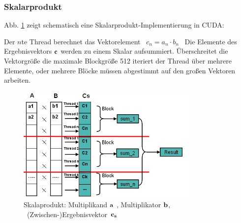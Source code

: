 


\subsubsection{Skalarprodukt}

Abb. \ref{Vektor} zeigt schematisch eine Skalarprodukt-Implementierung in CUDA:

Der $n$te Thread berechnet das Vektorelement \mbox{ $c_n = a_n \cdot b_n$ }
Die Elemente des Ergebnisvektors $ \bf c $ werden  zu einem Skalar
aufsummiert.
Überschreitet die Vektorgröße die maximale Blockgröße 512 iteriert der Thread
über mehrere Elemente, oder mehrere Blöcke müssen
abgestimmt auf den großen Vektoren arbeiten.


\begin{figure}[htbp]
\includegraphics[width=3.5in]{../xby/pic/Vektor}
\caption{ \label{Vektor} Skalaprodukt: Multiplikand $ \bf a$ , Multiplikator $ \bf b$,
\mbox{ (Zwischen-)Ergebnisvektor $\bf c_s$ }}

\end{figure}